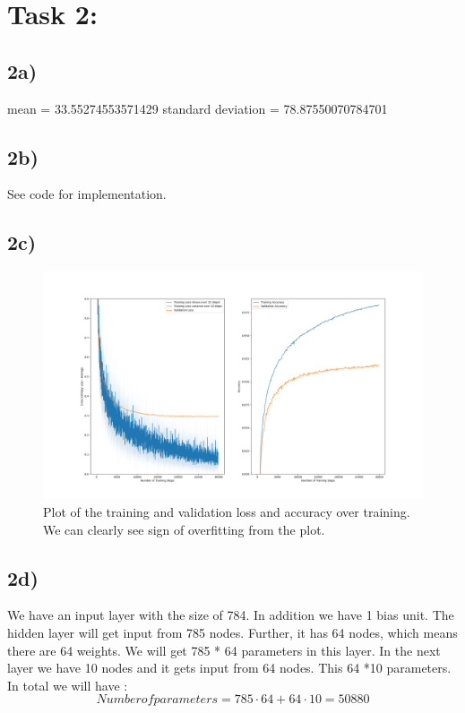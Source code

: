 \documentclass{article}
\begin{document}
\section*{Task 2:}

\subsection*{2a)}

mean = 33.55274553571429 \newline
standard deviation  = 78.87550070784701

\subsection*{2b)}
See code for implementation.
\subsection*{2c)}

\begin{figure}[h!]
    \centering
    \includegraphics[width=\linewidth]{task2c_train_loss.png}
    \caption[short]{Plot of the training and validation loss and accuracy over training. We can clearly see sign of overfitting from the plot. }
\end{figure}


\subsection*{2d)}

We have an input layer with the size of 784. In addition we have 1 bias unit. The hidden layer will
get input from 785 nodes. Further, it has 64 nodes, which means there are 64 weights. We will 
get 785 * 64 parameters in this layer. In the next layer we have 10 nodes and it gets input from 64 nodes. This 64 *10 parameters.
In total we will have : \newline
\begin{equation}
    Number of parameters = 785 \cdot 64 + 64 \cdot 10 = 50880 
\end{equation}
\end{document}
